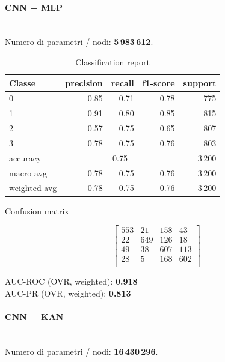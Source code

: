 \documentclass[a4paper,12pt]{report}
\begin{document}
	\paragraph{CNN + MLP} \mbox{}\\
	Numero di parametri / nodi: \textbf{5\,983\,612}.
	
	\begin{table}[H]
		\centering
		\caption{Classification report}
		\label{tab:cr_cnn_mlp}
		\begin{tabular}{lrrrr}
			\toprule
			Classe & precision & recall & f1-score & support \\
			\midrule
			0 & 0.85 & 0.71 & 0.78 & 775 \\
			1 & 0.91 & 0.80 & 0.85 & 815 \\
			2 & 0.57 & 0.75 & 0.65 & 807 \\
			3 & 0.78 & 0.75 & 0.76 & 803 \\
			\midrule
			accuracy & \multicolumn{3}{c}{0.75} & 3\,200 \\
			macro avg & 0.78 & 0.75 & 0.76 & 3\,200 \\
			weighted avg & 0.78 & 0.75 & 0.76 & 3\,200 \\
			\bottomrule
		\end{tabular}
	\end{table}
	
	\begin{table}[H]
		\centering
		\caption{Confusion matrix}
		\label{tab:cm_cnn_mlp}
		\[
		\begin{bmatrix}
			553 & 21  & 158 & 43 \\
			22  & 649 & 126 & 18 \\
			49  & 38  & 607 & 113 \\
			28  & 5   & 168 & 602 \\
		\end{bmatrix}
		\]
		\vspace{1mm}
		
		AUC-ROC (OVR, weighted): \textbf{0.918} \\
		AUC-PR  (OVR, weighted): \textbf{0.813}
	\end{table}
	
	\paragraph{CNN + KAN} \mbox{}\\
	Numero di parametri / nodi: \textbf{16\,430\,296}.
	
\end{document}
